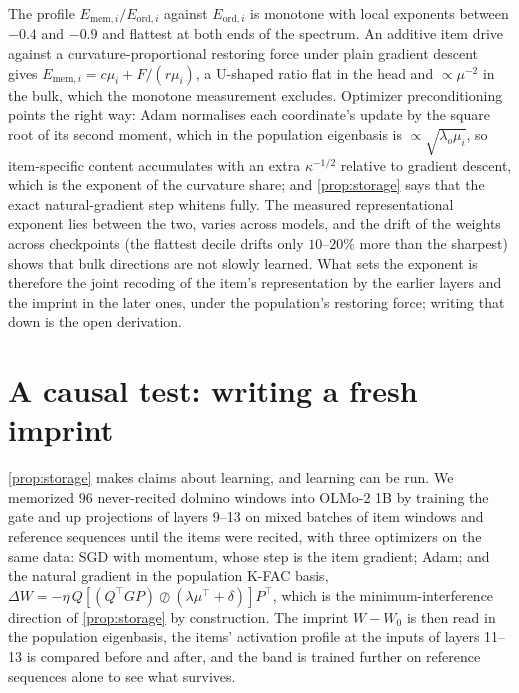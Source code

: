 \documentclass{article}
\theoremstyle{definition}\newtheorem{law}{Empirical law}
\begin{document}
The profile $E_{\mathrm{mem},i}/E_{\mathrm{ord},i}$ against $E_{\mathrm{ord},i}$ is monotone with local exponents between $-0.4$ and $-0.9$ and flattest at both ends of the spectrum. An additive item drive against a curvature-proportional restoring force under plain gradient descent gives $E_{\mathrm{mem},i}=c\mu_i+F/(r\mu_i)$, a U-shaped ratio flat in the head and $\propto\mu^{-2}$ in the bulk, which the monotone measurement excludes. Optimizer preconditioning points the right way: Adam \citep{kingma2015adam} normalises each coordinate's update by the square root of its second moment, which in the population eigenbasis is $\propto\sqrt{\lambda_o\mu_i}$, so item-specific content accumulates with an extra $\kappa^{-1/2}$ relative to gradient descent, which is the exponent of the curvature share; and \cref{prop:storage} says that the exact natural-gradient step whitens fully. The measured representational exponent lies between the two, varies across models, and the drift of the weights across checkpoints (the flattest decile drifts only $10$--$20\%$ more than the sharpest) shows that bulk directions are not slowly learned. What sets the exponent is therefore the joint recoding of the item's representation by the earlier layers and the imprint in the later ones, under the population's restoring force; writing that down is the open derivation.

\section{A causal test: writing a fresh imprint}\label{sec:causal}

\cref{prop:storage} makes claims about learning, and learning can be run. We memorized $96$ never-recited dolmino windows into OLMo-2 1B by training the gate and up projections of layers 9--13 on mixed batches of item windows and reference sequences until the items were recited, with three optimizers on the same data: SGD with momentum, whose step is the item gradient; Adam; and the natural gradient in the population K-FAC basis, $\Delta W=-\eta\,Q[(Q^\top GP)\oslash(\lambda\mu^\top+\delta)]P^\top$, which is the minimum-interference direction of \cref{prop:storage} by construction. The imprint $W-W_0$ is then read in the population eigenbasis, the items' activation profile at the inputs of layers 11--13 is compared before and after, and the band is trained further on reference sequences alone to see what survives.
\end{document}
